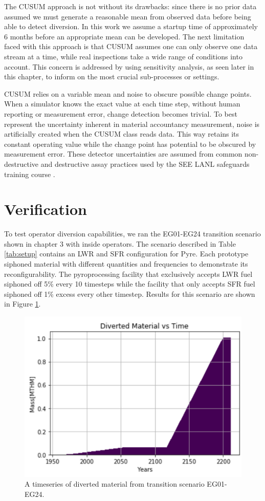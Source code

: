 The CUSUM approach is not without its drawbacks: since there is no prior data assumed we must generate a reasonable mean from observed data before being able to detect diversion. In this work
we assume a startup time of approximately 6 months before an appropriate mean can be developed. The next limitation faced with this approach is that CUSUM assumes one can only observe one data stream at a time, while
real inspections take a wide range of conditions into account. This concern is addressed by using sensitivity analysis, as seen later in this chapter, to inform on the most crucial
sub-processes or settings. 

CUSUM relies on a variable mean and noise to obscure possible change points. When a simulator knows the exact value at each time step, without human reporting or measurement error, change 
detection becomes trivial. To best represent the uncertainty inherent in material accountancy measurement, noise is artificially created when the CUSUM class reads data. This way \Cyclus retains its constant operating value while the change point
has potential to be obscured by measurement error. These detector uncertainties are assumed from common non-destructive and destructive assay practices used by the SEE LANL safeguards training course \cite{root_see_2019}.

\section{Verification}

To test operator diversion capabilities, we ran the EG01-EG24 transition scenario shown in chapter 3 with inside operators. The scenario described in Table \ref{tab:setup} contains an LWR and SFR configuration for Pyre. Each prototype siphoned material with different quantities and frequencies to demonstrate its reconfigurability. The pyroprocessing facility that exclusively accepts LWR fuel siphoned off 5\% every 10 timesteps while the facility that only accepts SFR fuel siphoned off 1\% excess every other timestep.  Results for this scenario are shown in Figure \ref{fig:divertmat}.

\begin{figure}
	\centering
	\includegraphics[width=0.9\linewidth]{images/divertmat}
	\caption{A timeseries of diverted material from transition scenario EG01-EG24.}
	\label{fig:divertmat}
\end{figure}

